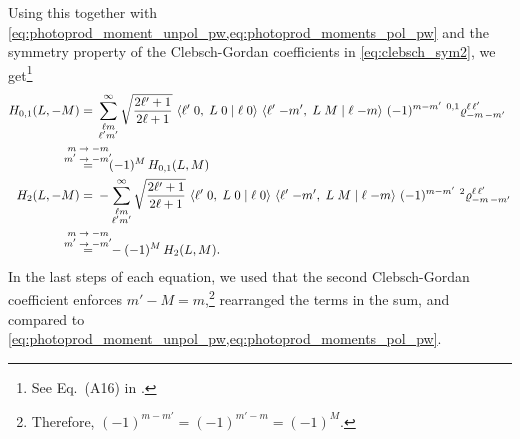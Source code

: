 Using this together with
\cref{eq:photoprod_moment_unpol_pw,eq:photoprod_moments_pol_pw} and the
symmetry property of the Clebsch-Gordan coefficients in
\cref{eq:clebsch_sym2}, we get\footnote{See Eq.~(A16) in
.}
\begin{align}
  H_{0, 1}(L, -M)
  ={}& \sum_{\substack{\ell m \\ \ell' m'}}^\infty
  \sqrt{\frac{2 \ell' + 1}{2 \ell + 1}}\,
  \clebsch{\ell'}{0}{L}{0}{\ell}{0}\, \clebsch{\ell'}{-m'}{L}{M}{\ell}{-m}\,
  (-1)^{m - m'}\, \prescript{0, 1}{}{\varrho}^{\ell\, \ell'}_{{-m}\, {-m}'} \nonumber
  \\
  \label{eq:photoprod_moments_01_sym_2}
  \equalUsing{$\mathclap{\substack{\displaystyle{m \to -m} \\ \displaystyle{m' \to -m'}}}$}{}& \quad
  (-1)^M\, H_{0, 1}(L, M)
  \\
  H_2(L, -M)
  ={}& -\sum_{\substack{\ell m \\ \ell' m'}}^\infty
  \sqrt{\frac{2 \ell' + 1}{2 \ell + 1}}\,
  \clebsch{\ell'}{0}{L}{0}{\ell}{0}\, \clebsch{\ell'}{-m'}{L}{M}{\ell}{-m}\,
  (-1)^{m - m'}\, \prescript{2}{}{\varrho}^{\ell\, \ell'}_{{-m}\, {-m}'} \nonumber
  \\
  \label{eq:photoprod_moment_2_sym_2}
  \equalUsing{$\mathclap{\substack{\displaystyle{m \to -m} \\ \displaystyle{m' \to -m'}}}$}{}& \quad
  -(-1)^M\, H_2(L, M).
\end{align}
In the last steps of each equation, we used that the second
Clebsch-Gordan coefficient enforces $m' - M = m$,\footnote{Therefore,
$(-1)^{m - m'} = (-1)^{m' - m} = (-1)^M$.} rearranged the terms in the
sum, and compared to
\cref{eq:photoprod_moment_unpol_pw,eq:photoprod_moments_pol_pw}.

